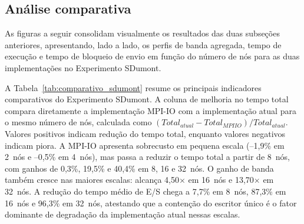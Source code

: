\subsection{Análise comparativa}
\label{sec:avaliacao_comparativa_sdumont}
As figuras a seguir consolidam visualmente os resultados das duas
subseções anteriores, apresentando, lado a lado, os perfis de banda
agregada, tempo de execução e tempo de bloqueio de envio em função do
número de nós para as duas implementações no Experimento SDumont.

A Tabela~\ref{tab:comparativo_sdumont} resume os principais indicadores
comparativos do Experimento SDumont. A coluna de melhoria no tempo total
compara diretamente a implementação MPI-IO com a implementação atual para
o mesmo número de nós, calculada como
$(Total_{atual} - Total_{MPIIO})/Total_{atual}$. Valores positivos
indicam redução do tempo total, enquanto valores negativos indicam piora.
A MPI-IO apresenta sobrecusto em pequena escala (--1{,}9\% em 2~nós e
--0{,}5\% em 4~nós), mas passa a reduzir o tempo total a partir de
8~nós, com ganhos de 0{,}3\%, 19{,}5\% e 40{,}4\% em 8, 16 e
32~nós. O ganho de banda também cresce nas maiores escalas: alcança
4{,}50$\times$ em 16~nós e 13{,}70$\times$ em 32~nós. A redução do
tempo médio de E/S chega a 7{,}7\% em 8~nós, 87{,}3\% em 16~nós e
96{,}3\% em 32~nós, atestando que a
contenção do escritor único é o fator dominante de degradação da
implementação atual nessas escalas.

